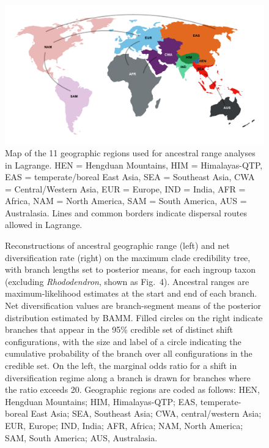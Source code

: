 \begin{figure}
\centering
\includegraphics[width=.99\linewidth]{figures/regions.pdf}
\caption{Map of the 11 geographic regions used for ancestral range
  analyses in Lagrange.  HEN = Hengduan Mountains, HIM =
  Himalayas-QTP, EAS = temperate/boreal East Asia, SEA = Southeast
  Asia, CWA = Central/Western Asia, EUR = Europe, IND = India, AFR =
  Africa, NAM = North America, SAM = South America, AUS =
  Australasia. Lines and common borders indicate dispersal routes
  allowed in Lagrange.}
\label{fig:regions}
\end{figure}

\begin{figure}
  \caption{Reconstructions of ancestral geographic range (left) and
    net diversification rate (right) on the maximum clade credibility
    tree, with branch lengths set to posterior means, for each ingroup
    taxon (excluding \textit{Rhododendron}, shown as
    Fig.~4). Ancestral ranges are maximum-likelihood estimates at the
    start and end of each branch. Net diversification values are
    branch-segment means of the posterior distribution estimated by
    BAMM. Filled circles on the right indicate branches that appear in
    the 95\% credible set of distinct shift configurations, with the
    size and label of a circle indicating the cumulative probability
    of the branch over all configurations in the credible set. On the
    left, the marginal odds ratio for a shift in diversification
    regime along a branch is drawn for branches where the ratio
    exceeds 20. Geographic regions are coded as follows: HEN, Hengduan
    Mountains; HIM, Himalayas-QTP; EAS, temperate-boreal East Asia;
    SEA, Southeast Asia; CWA, central/western Asia; EUR, Europe; IND,
    India; AFR, Africa; NAM, North America; SAM, South America; AUS,
    Australasia.}
  \label{fig:ancranges}
\end{figure}

